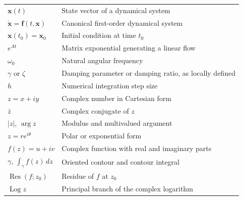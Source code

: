\begin{longtable}{@{}p{}p{}@{}}
$\mathbf x(t)$ & State vector of a dynamical system\\
$\dot{\mathbf x}=\mathbf f(t,\mathbf x)$ & Canonical first-order dynamical system\\
$\mathbf x(t_0)=\mathbf x_0$ & Initial condition at time $t_0$\\
$e^{At}$ & Matrix exponential generating a linear flow\\
$\omega_0$ & Natural angular frequency\\
$\gamma$ or $\zeta$ & Damping parameter or damping ratio, as locally defined\\
$h$ & Numerical integration step size\\
$z=x+iy$ & Complex number in Cartesian form\\
$\bar z$ & Complex conjugate of $z$\\
$|z|$, $\arg z$ & Modulus and multivalued argument\\
$z=re^{i\theta}$ & Polar or exponential form\\
$f(z)=u+iv$ & Complex function with real and imaginary parts\\
$\gamma$, $\displaystyle\int_\gamma f(z)\,dz$ & Oriented contour and contour integral\\
$\operatorname{Res}(f;z_0)$ & Residue of $f$ at $z_0$\\
$\operatorname{Log} z$ & Principal branch of the complex logarithm\\
\bottomrule
\end{longtable}
